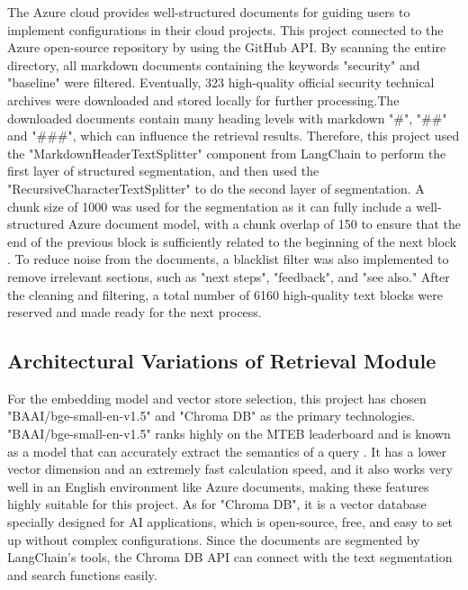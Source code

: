 \documentclass[11pt]{article}
\begin{document}
The Azure cloud provides well-structured documents for guiding users to implement configurations in their cloud projects. This project connected to the Azure open-source repository by using the GitHub API. By scanning the entire directory, all markdown documents containing the keywords "security" and "baseline" were filtered. Eventually, 323 high-quality official security technical archives were downloaded and stored locally for further processing.The downloaded documents contain many heading levels with markdown "\#", "\#\#" and "\#\#\#", which can influence the retrieval results. Therefore, this project used the "MarkdownHeaderTextSplitter" component from LangChain to perform the first layer of structured segmentation, and then used the "RecursiveCharacterTextSplitter" to do the second layer of segmentation. A chunk size of 1000 was used for the segmentation as it can fully include a well-structured Azure document model, with a chunk overlap of 150 to ensure that the end of the previous block is sufficiently related to the beginning of the next block \citep{gao2023retrieval}. To reduce noise from the documents, a blacklist filter was also implemented to remove irrelevant sections, such as "next steps", "feedback", and "see also." After the cleaning and filtering, a total number of 6160 high-quality text blocks were reserved and made ready for the next process.

\subsection{Architectural Variations of Retrieval Module}

For the embedding model and vector store selection, this project has chosen "BAAI/bge-small-en-v1.5" and "Chroma DB" as the primary technologies. "BAAI/bge-small-en-v1.5" ranks highly on the MTEB leaderboard and is known as a model that can accurately extract the semantics of a query \citep{muennighoff2022mteb}. It has a lower vector dimension and an extremely fast calculation speed, and it also works very well in an English environment like Azure documents, making these features highly suitable for this project. As for "Chroma DB", it is a vector database specially designed for AI applications, which is open-source, free, and easy to set up without complex configurations. Since the documents are segmented by LangChain's tools, the Chroma DB API can connect with the text segmentation and search functions easily.
\end{document}

